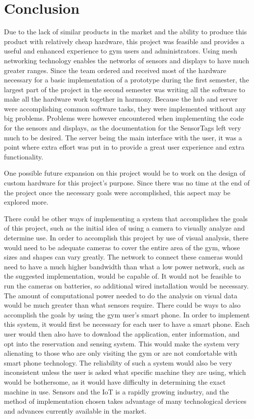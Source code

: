 \documentclass[PPFS.tex]{template/subfiles}
\begin{document}
\section{Conclusion}
Due to the lack of similar products in the market and the ability to produce this product with relatively cheap hardware, this project was feasible and provides a useful and enhanced experience to gym users and administrators. Using mesh networking technology enables the networks of sensors and displays to have much greater ranges. 
Since the team ordered and received most of the hardware necessary for a basic implementation of a prototype during the first semester, the largest part of the project in the second semester was writing all the software to make all the hardware work together in harmony. Because the hub and server were accomplishing common software tasks, they were implemented without any big problems. Problems were however encountered when implementing the code for the sensors and displays, as the documentation for the SensorTags left very much to be desired. The server being the main interface with the user, it was a point where extra effort was put in to provide a great user experience and extra functionality. 

One possible future expansion on this project would be to work on the design of custom hardware for this project's purpose. Since there was no time at the end of the project once the necessary goals were accomplished, this aspect may be explored more.

There could be other ways of implementing a system that accomplishes the goals of this project, such as the initial idea of using a camera to visually analyze and determine use. In order to accomplish this project by use of visual analysis, there would need to be adequate cameras to cover the entire area of the gym, whose sizes and shapes can vary greatly. The network to connect these cameras would need to have a much higher bandwidth than what a low power network, such as the suggested implementation, would be capable of. It would not be feasible to run the cameras on batteries, so additional wired installation would be necessary. The amount of computational power needed to do the analysis on visual data would be much greater than what sensors require. There could be ways to also accomplish the goals by using the gym user's smart phone. In order to implement this system, it would first be necessary for each user to have a smart phone. Each user would then also have to download the application, enter information, and opt into the reservation and sensing system. This would make the system very alienating to those who are only visiting the gym or are not comfortable with smart phone technology. The reliability of such a system would also be very inconsistent unless the user is asked what specific machine they are using, which would be bothersome, as it would have difficulty in determining the exact machine in use. Sensors and the IoT is a rapidly growing industry, and the method of implementation chosen takes advantage of many technological devices and advances currently available in the market.
\end{document}
